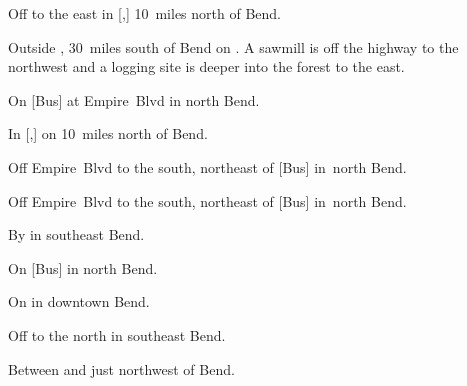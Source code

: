 

\begin{LocationList}

Off  to the east in [,] 10~miles north of Bend.

Outside , 30~miles south of Bend on .
A sawmill is off the highway to the northwest and a logging site is deeper into the forest to the east.

\Location{\GarageHQ \Garage}
On  [Bus] at Empire~Blvd in north Bend.

\Location{\GasStation \Gas \Rest}
In [,] on  10~miles north of Bend.

Off Empire~Blvd to the south, northeast of  [Bus] in~north Bend.

Off Empire~Blvd to the south, northeast of  [Bus] in~north Bend.

By  in southeast Bend.

\Location{\RecruitmentAgency \Recruitment}
On  [Bus] in north Bend.

On  in downtown Bend.

Off  to the north in southeast Bend.

Between  and  just northwest of Bend.

\end{LocationList}
